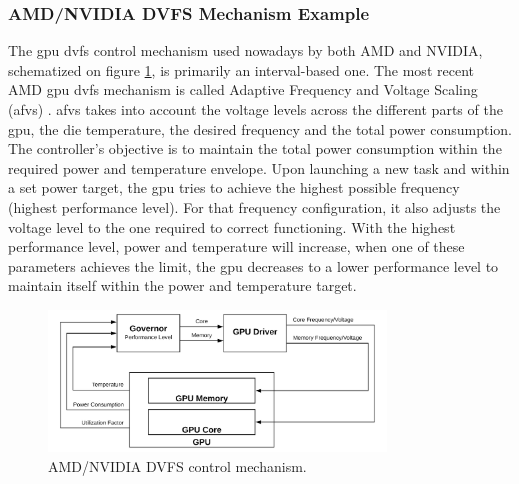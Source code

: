 \subsubsection{AMD/NVIDIA DVFS Mechanism Example}

The \acrshort{gpu} \acrshort{dvfs} control mechanism used nowadays by both AMD and NVIDIA, schematized on figure \ref{fig:DVFSmechanism}, is primarily an interval-based one. The most recent AMD \acrshort{gpu} \acrshort{dvfs} mechanism is called Adaptive Frequency and Voltage Scaling (\acrshort{afvs}) \cite{amd_polaris_2017}. \acrshort{afvs} takes into account the voltage levels across the different parts of the \acrshort{gpu}, the die temperature, the desired frequency and the total power consumption. The controller's objective is to maintain the total power consumption within the required power and temperature envelope. Upon launching a new task and within a set power target, the \acrshort{gpu} tries to achieve the highest possible frequency (highest performance level). For that frequency configuration, it also adjusts the voltage level to the one required to correct functioning. With the highest performance level, power and temperature will increase, when one of these parameters achieves the limit, the \acrshort{gpu} decreases to a lower performance level to maintain itself within the power and temperature target. 

\begin{figure}[htb]
  \centering
  \includegraphics[width=0.8\textwidth]{Figures/Background/DVFS.png}
  \caption{AMD/NVIDIA DVFS control mechanism.}
  \label{fig:DVFSmechanism}
\end{figure}

